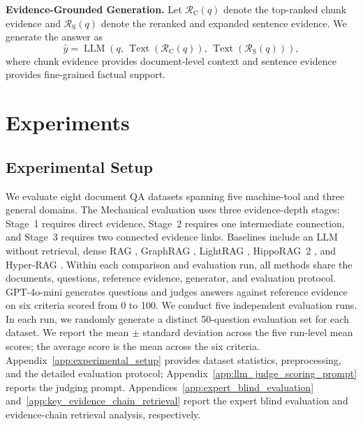 \documentclass{article} %
\begin{document}
\smallskip
\noindent\textbf{Evidence-Grounded Generation.}
Let $\mathcal{R}_{\mathrm{C}}(q)$ denote the top-ranked chunk evidence and $\mathcal{R}_{\mathrm{S}}(q)$ denote the reranked and expanded sentence evidence. We generate the answer as
\begin{equation}
\hat{y}
=
\operatorname{LLM}\!\left(
q,\,
\operatorname{Text}\!\left(\mathcal{R}_{\mathrm{C}}(q)\right),\,
\operatorname{Text}\!\left(\mathcal{R}_{\mathrm{S}}(q)\right)
\right),
\label{eq:evidence_grounded_generation}
\end{equation}
where chunk evidence provides document-level context and sentence evidence provides fine-grained factual support.

\section{Experiments}\label{sec:experiments}
\subsection{Experimental Setup}

We evaluate eight document QA datasets spanning five machine-tool and three general domains. The Mechanical evaluation uses three evidence-depth stages: Stage~1 requires direct evidence, Stage~2 requires one intermediate connection, and Stage~3 requires two connected evidence links. Baselines include an LLM without retrieval, dense RAG \citep{Karpukhin2020DPR}, GraphRAG \citep{Edge2025GraphRAG}, LightRAG \citep{Guo2025LightRAG}, HippoRAG~2 \citep{Gutierrez2025HippoRAG2}, and Hyper-RAG \citep{Feng2026HyperRAG}. Within each comparison and evaluation run, all methods share the documents, questions, reference evidence, generator, and evaluation protocol. GPT-4o-mini generates questions and judges answers against reference evidence on six criteria scored from 0 to 100. We conduct five independent evaluation runs. In each run, we randomly generate a distinct 50-question evaluation set for each dataset. We report the mean $\pm$ standard deviation across the five run-level mean scores; the average score is the mean across the six criteria. Appendix~\ref{app:experimental_setup} provides dataset statistics, preprocessing, and the detailed evaluation protocol; Appendix~\ref{app:llm_judge_scoring_prompt} reports the judging prompt. Appendices~\ref{app:expert_blind_evaluation} and~\ref{app:key_evidence_chain_retrieval} report the expert blind evaluation and evidence-chain retrieval analysis, respectively.
\end{document}
